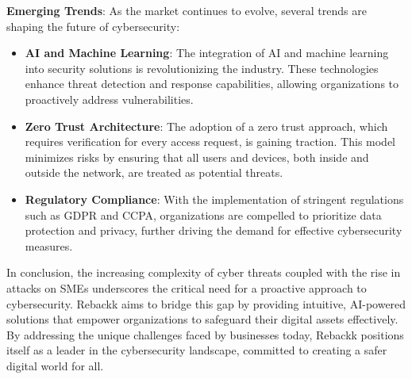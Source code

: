 \textbf{Emerging Trends}:  
As the market continues to evolve, several trends are shaping the future of cybersecurity:
\begin{itemize}
    \item \textbf{AI and Machine Learning}: The integration of AI and machine learning into security solutions is revolutionizing the industry. These technologies enhance threat detection and response capabilities, allowing organizations to proactively address vulnerabilities.
    \item \textbf{Zero Trust Architecture}: The adoption of a zero trust approach, which requires verification for every access request, is gaining traction. This model minimizes risks by ensuring that all users and devices, both inside and outside the network, are treated as potential threats.
    \item \textbf{Regulatory Compliance}: With the implementation of stringent regulations such as GDPR and CCPA, organizations are compelled to prioritize data protection and privacy, further driving the demand for effective cybersecurity measures.
\end{itemize}

In conclusion, the increasing complexity of cyber threats coupled with the rise in attacks on SMEs underscores the critical need for a proactive approach to cybersecurity. Rebackk aims to bridge this gap by providing intuitive, AI-powered solutions that empower organizations to safeguard their digital assets effectively. By addressing the unique challenges faced by businesses today, Rebackk positions itself as a leader in the cybersecurity landscape, committed to creating a safer digital world for all.